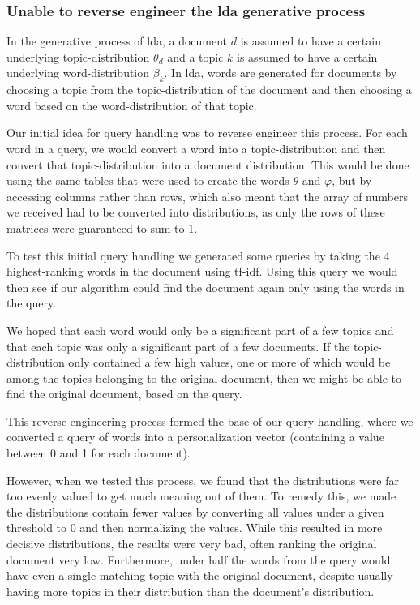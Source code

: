\subsubsection{Unable to reverse engineer the \gls{lda} generative process}
In the generative process of \gls{lda}, a document $d$ is assumed to have a certain underlying topic-distribution $\theta_d$ and a topic $k$ is assumed to have a certain underlying word-distribution $\beta_k$.
In \gls{lda}, words are generated for documents by choosing a topic from the topic-distribution of the document and then choosing a word based on the word-distribution of that topic.

Our initial idea for query handling was to reverse engineer this process.
For each word in a query, we would convert a word into a topic-distribution and then convert that topic-distribution into a document distribution.
This would be done using the same tables that were used to create the words $\theta$ and $\varphi$, but by accessing columns rather than rows, which also meant that the array of numbers we received had to be converted into distributions, as only the rows of these matrices were guaranteed to sum to 1.

To test this initial query handling we generated some queries by taking the 4 highest-ranking words in the document using tf-idf. Using this query we would then see if our algorithm could find the document again only using the words in the query.

We hoped that each word would only be a significant part of a few topics and that each topic was only a significant part of a few documents.
If the topic-distribution only contained a few high values, one or more of which would be among the topics belonging to the original document, then we might be able to find the original document, based on the query.

This reverse engineering process formed the base of our query handling, where we converted a query of words into a personalization vector (containing a value between 0 and 1 for each document).

However, when we tested this process, we found that the distributions were far too evenly valued to get much meaning out of them.
To remedy this, we made the distributions contain fewer values by converting all values under a given threshold to 0 and then normalizing the values.
While this resulted in more decisive distributions, the results were very bad, often ranking the original document very low.
Furthermore, under half the words from the query would have even a single matching topic with the original document, despite usually having more topics in their distribution than the document's distribution.
 
